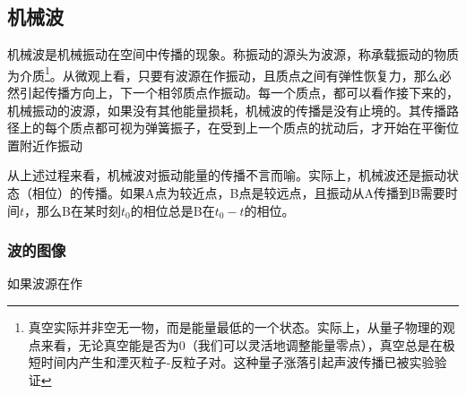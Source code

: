 
\subsection{机械波}
机械波是机械振动在空间中传播的现象。称振动的源头为波源，称承载振动的物质为介质\footnote{真空实际并非空无一物，而是能量最低的一个状态。实际上，从量子物理的观点来看，无论真空能是否为0（我们可以灵活地调整能量零点），真空总是在极短时间内产生和湮灭粒子-反粒子对。这种量子涨落引起声波传播已被实验验证}。从微观上看，只要有波源在作振动，且质点之间有弹性恢复力，那么必然引起传播方向上，下一个相邻质点作振动。每一个质点，都可以看作接下来的，机械振动的波源，如果没有其他能量损耗，机械波的传播是没有止境的。其传播路径上的每个质点都可视为弹簧振子，在受到上一个质点的扰动后，才开始在平衡位置附近作振动

从上述过程来看，机械波对振动能量的传播不言而喻。实际上，机械波还是振动状态（相位）的传播。如果A点为较近点，B点是较远点，且振动从A传播到B需要时间$t$，那么B在某时刻$t_0$的相位总是B在$t_0-t$的相位。
\subsubsection{波的图像}
如果波源在作